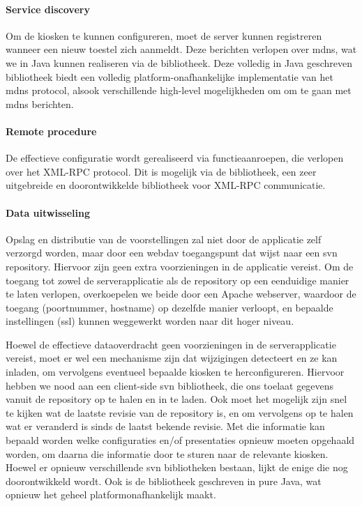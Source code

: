 \documentclass[verslag.tex]{subfiles}
\begin{document}
\paragraph{Service discovery} Om de kiosken te kunnen configureren, moet de server kunnen registreren wanneer een nieuw toestel zich aanmeldt. Deze berichten verlopen over \ac{mdns}, wat we in Java kunnen realiseren via de  bibliotheek. Deze volledig in Java geschreven bibliotheek biedt een volledig platform-onafhankelijke implementatie van het \ac{mdns} protocol, alsook verschillende high-level mogelijkheden om om te gaan met \ac{mdns} berichten.

\paragraph{Remote procedure} De effectieve configuratie wordt gerealiseerd via functieaanroepen, die verlopen over het XML-RPC protocol. Dit is mogelijk via de  bibliotheek, een zeer uitgebreide en doorontwikkelde bibliotheek voor XML-RPC communicatie.

\paragraph{Data uitwisseling} Opslag en distributie van de voorstellingen zal niet door de applicatie zelf verzorgd worden, maar door een \ac{webdav} toegangspunt dat wijst naar een \ac{svn} repository. Hiervoor zijn geen extra voorzieningen in de applicatie vereist. Om de toegang tot zowel de serverapplicatie als de repository op een eenduidige manier te laten verlopen, overkoepelen we beide door een Apache webserver, waardoor de toegang (poortnummer, hostname) op dezelfde manier verloopt, en bepaalde instellingen (\ac{ssl}) kunnen weggewerkt worden naar dit hoger niveau.

Hoewel de effectieve dataoverdracht geen voorzieningen in de serverapplicatie vereist, moet er wel een mechanisme zijn dat wijzigingen detecteert en ze kan inladen, om vervolgens eventueel bepaalde kiosken te herconfigureren. Hiervoor hebben we nood aan een client-side \ac{svn} bibliotheek, die ons toelaat gegevens vanuit de repository op te halen en in te laden. Ook moet het mogelijk zijn snel te kijken wat de laatste revisie van de repository is, en om vervolgens op te halen wat er veranderd is sinds de laatst bekende revisie. Met die informatie kan bepaald worden welke configuraties en/of presentaties opnieuw moeten opgehaald worden, om daarna die informatie door te sturen naar de relevante kiosken.
Hoewel er opnieuw verschillende \ac{svn} bibliotheken bestaan, lijkt  de enige die nog doorontwikkeld wordt. Ook is de bibliotheek geschreven in pure Java, wat opnieuw het geheel platformonafhankelijk maakt.
\end{document}
